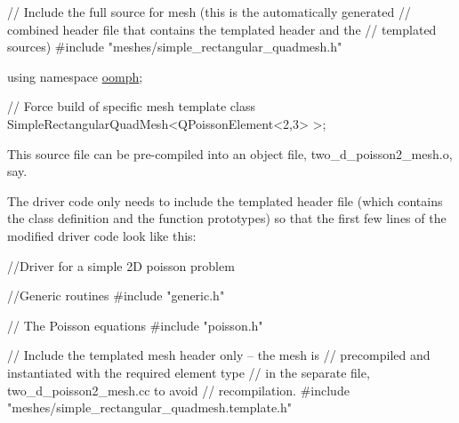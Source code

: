 \begin{DoxyCodeInclude}
\textcolor{comment}{// Include the full source for mesh (this is the automatically generated}
\textcolor{comment}{// combined header file that contains the templated header and the}
\textcolor{comment}{// templated sources)}
\textcolor{preprocessor}{#include "meshes/simple\_rectangular\_quadmesh.h"}

\textcolor{keyword}{using namespace }\hyperlink{namespaceoomph}{oomph};

\textcolor{comment}{// Force build of specific mesh}
\textcolor{keyword}{template} \textcolor{keyword}{class }SimpleRectangularQuadMesh<QPoissonElement<2,3> >;



\end{DoxyCodeInclude}


This source file can be pre-\/compiled into an object file, {\ttfamily two\+\_\+d\+\_\+poisson2\+\_\+mesh.\+o}, say.

The driver code only needs to include the templated header file (which contains the class definition and the function prototypes) so that the first few lines of the modified driver code look like this\+:

 
\begin{DoxyCodeInclude}
\textcolor{comment}{//Driver for a simple 2D poisson problem}

\textcolor{comment}{//Generic routines}
\textcolor{preprocessor}{#include "generic.h"}

\textcolor{comment}{// The Poisson equations}
\textcolor{preprocessor}{#include "poisson.h"}

\textcolor{comment}{// Include the templated mesh header only -- the mesh is}
\textcolor{comment}{// precompiled and instantiated with the required element type}
\textcolor{comment}{// in the separate file, two\_d\_poisson2\_mesh.cc to avoid}
\textcolor{comment}{// recompilation.}
\textcolor{preprocessor}{#include "meshes/simple\_rectangular\_quadmesh.template.h"}

\end{DoxyCodeInclude}


